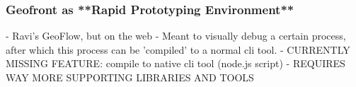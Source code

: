 




\subsubsection{Geofront as **Rapid Prototyping Environment**} 
  - Ravi's GeoFlow, but on the web
    - Meant to visually debug a certain process, after which this process can be 'compiled' to a normal cli tool.
  - CURRENTLY MISSING FEATURE: compile to native cli tool (node.js script)
  - REQUIRES WAY MORE SUPPORTING LIBRARIES AND TOOLS
